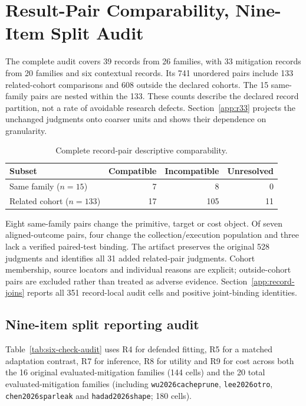 \section{Result-Pair Comparability, Nine-Item Split Audit}\label{app:result-audit}
The complete audit covers 39 records from 26 families, with 33 mitigation records from 20 families and six contextual records. Its 741 unordered pairs include 133 related-cohort comparisons and 608 outside the declared cohorts. The 15 same-family pairs are nested within the 133. These counts describe the declared record partition, not a rate of avoidable research defects. Section~\ref{app:r33} projects the unchanged judgments onto coarser units and shows their dependence on granularity.
\begin{table}[t]\centering\footnotesize
\caption{Complete record-pair descriptive comparability.}\label{tab:pair-descriptive}
\begin{tabularx}{\columnwidth}{@{}Yrrr@{}}\toprule
Subset & Compatible & Incompatible & Unresolved\\\midrule
Same family ($n=15$) &7&8&0\\
Related cohort ($n=133$) &17&105&11\\\bottomrule
\end{tabularx}\end{table}
Eight same-family pairs change the primitive, target or cost object. Of seven aligned-outcome pairs, four change the collection/execution population and three lack a verified paired-test binding. The artifact preserves the original 528 judgments and identifies all 31 added related-pair judgments. Cohort membership, source locators and individual reasons are explicit; outside-cohort pairs are excluded rather than treated as adverse evidence. Section~\ref{app:record-joins} reports all 351 record-local audit cells and positive joint-binding identities.

\subsection{Nine-item split reporting audit}
Table~\ref{tab:six-check-audit} uses R4 for defended fitting, R5 for a matched adaptation contrast, R7 for inference, R8 for utility and R9 for cost across both the 16 original evaluated-mitigation families (144 cells) and the 20 total evaluated-mitigation families (including \texttt{wu2026cacheprune}, \texttt{lee2026otro}, \texttt{chen2026sparleak} and \texttt{hadad2026shape}; 180 cells).


